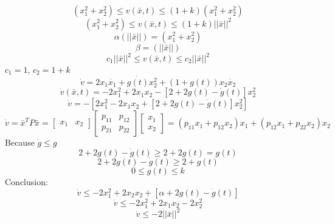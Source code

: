 \documentclass[12pt]{article}
\begin{document}
$$(x_1^2+x_2^2)\leq v(\bar{x},t)\leq (1+k)(x_1^2+x_2^2)$$
$$(x_1^2+x_2^2)\leq v(\bar{x},t)\leq (1+k)||\bar{x}||^2$$
$$\alpha(||\bar{x}||)=(x_1^2+x_2^2)$$
$$\beta=(||\bar{x}||)$$
$$c_1||\bar{x}||^2\leq v(\bar{x},t)\leq c_2||\bar{x}||^2$$
$c_1=1$, $c_2=1+k$
$$\dot{v}=2x_1\dot{x_1}+\dot{g(t)}x_2^2+(1+g(t))x_2\dot{x_2}$$
$$\dot{v}(\bar{x},t)=-2x_1^2+2x_1x_2-[2+2g(t)-\dot{g}(t)]x_2^2$$
$$\dot{v}=-[2x_1^2-2x_1x_2+[2+2g(t)-\dot{g}(t)]x_2^2]$$
$$\dot{v}=\bar{x}^TP\bar{x}=\begin{bmatrix} x_1 & x_2 \end{bmatrix}
\begin{bmatrix} p_{11} & p_{12} \\
p_{21} & p_{22} \end{bmatrix}\begin{bmatrix} x_1 \\ x_2 \end{bmatrix} = (p_{11}x_1+p_{12}x_2)x_1+(p_{12}x_1+p_{22}x_2)x_2$$
Because $\dot{g}\leq g$
$$2+2g(t)-\dot{g}(t)\geq 2+2g(t)=g(t)$$
$$2+2g(t)-\dot{g}(t)\geq 2+g(t)$$
$$0\leq g(t) \leq k$$
Conclusion:
$$\dot{v}\leq -2x_1^2+2x_2x_2+[\alpha+2g(t)-\dot{g}(t)]$$
$$\dot{v}\leq -2x_1^2+2x_1x_2-2x_2^2$$
$$\dot{v}\leq -2||\bar{x}||^2$$
\end{document}
